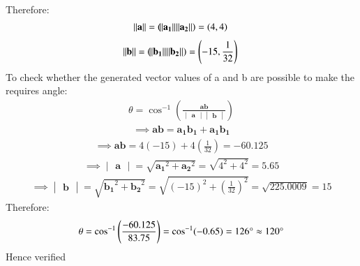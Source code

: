 \documentclass[12pt,-letter paper]{article}
\let\vec\mathbf{}
\let\vec\mathbf{}
\let\vec\mathbf{}
\providecommand{\brak}[1]{\ensuremath{\left(#1\right)}}
\newcommand{\mydet}[1]{\ensuremath{\begin{vmatrix}#1\end{vmatrix}}}
\providecommand{\brak}[1]{\ensuremath{\left(#1\right)}}
\begin{document}
\begin{enumerate}
\begin{align}
  \end{align}
  Therefore:
  \begin{align}
    \norm{\vec{a}}=(\norm{\vec{a_1}}\vec{\norm{a_2}}) = (4,4)
    \end{align}
     \begin{align}
  \norm{\vec{b}}=(\norm{\vec{b_1}}\vec{\norm{b_2}}) = \brak{-15,\frac{1}{32}}
 \end{align}
To check whether the generated vector values of a and b are possible to make the requires angle:
 \begin{align}
	  \theta = \cos^{-1}\brak{{\frac{\vec{a}\vec{b}}{\mydet{\vec{a}}\mydet{\vec{b}}}}}
   \end{align}
   \begin{align}
   \implies \vec{a}\vec{b} = \vec{a_1} \vec{b_1} + \vec{a_1} \vec{b_1}
     \end{align}
   \begin{align}
   \implies \vec{a}\vec{b} = 4(-15) + 4\brak{\frac{1}{32}} = -60.125
   \end{align}
   \begin{align}
   \implies \mydet{\vec{a}}=\sqrt{\vec{a_1}^2 + \vec{a_2}^2} = \sqrt{4^2 +4^2} = 5.65
   \end{align}
     \begin{align}
     \implies \mydet{\vec{b}}=\sqrt{\vec{b_1}^2 + \vec{b_2}^2} = \sqrt{(-15)^2 +\brak{\frac{1}{32}}^2} = \sqrt{225.0009} = 15
      \end{align}
       Therefore: 
       \begin{align}
       \theta = \cos^{-1}\brak{\frac{-60.125}{83.75}} = \cos^{-1}(-0.65) = 126\degree \approx 120\degree
    \end{align}
    Hence verified
  \end{enumerate}
\end{document}
